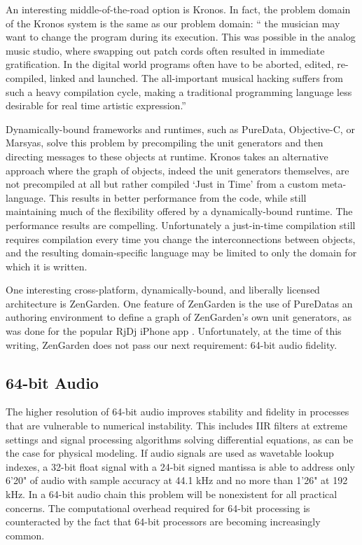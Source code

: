 \documentclass[twoside,10pt]{article}
\begin{document}
An interesting middle-of-the-road option is Kronos.  In fact, the problem domain of the Kronos system is the same as our problem domain: `` the musician may want to change the program during its execution. This was possible in the analog music studio, where swapping out patch cords often resulted in immediate gratification. In the digital world programs often have to be aborted, edited, re-compiled, linked and launched. The all-important musical hacking suffers from such a heavy compilation cycle, making a traditional programming language less desirable for real time artistic expression.'' \cite{Norilo:2009}

Dynamically-bound frameworks and runtimes, such as PureData, Objective-C, or Marsyas, solve this problem by precompiling the unit generators and then directing messages to these objects at runtime.  Kronos takes an alternative approach where the graph of objects, indeed the unit generators themselves, are not precompiled at all but rather compiled `Just in Time' from a custom meta-language. This results in better performance from the code, while still maintaining much of the flexibility offered by a dynamically-bound runtime.  The performance results are compelling.  Unfortunately a just-in-time compilation still requires compilation every time you change the interconnections between objects, and the resulting domain-specific language may be limited to only the domain for which it is written.

One interesting cross-platform, dynamically-bound, and liberally licensed architecture is ZenGarden\cite{web4}.  One feature of ZenGarden is the use of PureDatas an authoring environment to define a graph of ZenGarden's own unit generators, as was done for the popular RjDj iPhone app \cite{web5}.  Unfortunately, at the time of this writing, ZenGarden does not pass our next requirement: 64-bit audio fidelity.



\subsection{64-bit Audio} %

The higher resolution of 64-bit audio improves stability and fidelity in processes that are vulnerable to numerical instability.  This includes IIR filters at extreme settings and signal processing algorithms solving differential equations, as can be the case for physical modeling.  If audio signals are used as wavetable lookup indexes, a 32-bit float signal with a 24-bit signed mantissa is able to address only 6'20" of audio with sample accuracy at 44.1 kHz and no more than 1'26" at 192 kHz. In a 64-bit audio chain this problem will be nonexistent for all practical concerns. The computational overhead required for 64-bit processing is counteracted by the fact that 64-bit processors are becoming increasingly common.
\end{document}
